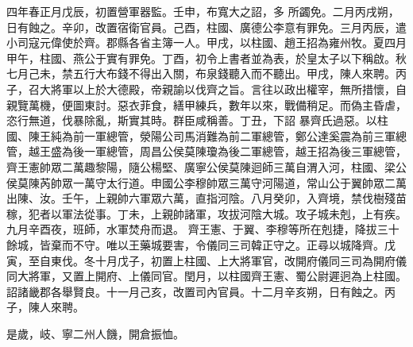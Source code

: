 \begin{pinyinscope}
 四年春正月戊辰，初置營軍器監。壬申，布寬大之詔，多
 所蠲免。二月丙戌朔，日有蝕之。辛卯，改置宿衛官員。己酉，柱國、廣德公李意有罪免。三月丙辰，遣小司寇元偉使於齊。郡縣各省主簿一人。甲戌，以柱國、趙王招為雍州牧。夏四月甲午，柱國、燕公于實有罪免。丁酉，初令上書者並為表，於皇太子以下稱啟。秋七月己未，禁五行大布錢不得出入關，布泉錢聽入而不聽出。甲戌，陳人來聘。丙子，召大將軍以上於大德殿，帝親諭以伐齊之旨。言往以政出權宰，無所措懷，自親覽萬機，便圖東討。惡衣菲食，繕甲練兵，數年以來，戰備稍足。而偽主昏虐，恣行無道，伐暴除亂，斯實其時。群臣咸稱善。丁丑，下詔
 暴齊氏過惡。以柱國、陳王純為前一軍總管，滎陽公司馬消難為前二軍總管，鄭公達奚震為前三軍總管，越王盛為後一軍總管，周昌公侯莫陳瓊為後二軍總管，越王招為後三軍總管，齊王憲帥眾二萬趣黎陽，隨公楊堅、廣寧公侯莫陳迴師三萬自渭入河，柱國、梁公侯莫陳芮帥眾一萬守太行道。申國公李穆帥眾三萬守河陽道，常山公于翼帥眾二萬出陳、汝。壬午，上親帥六軍眾六萬，直指河陰。八月癸卯，入齊境，禁伐樹殘苗稼，犯者以軍法從事。丁未，上親帥諸軍，攻拔河陰大城。攻子城未剋，上有疾。九月辛酉夜，班師，水軍焚舟而退。
 齊王憲、于翼、李穆等所在剋捷，降拔三十餘城，皆棄而不守。唯以王藥城要害，令儀同三司韓正守之。正尋以城降齊。戊寅，至自東伐。冬十月戊子，初置上柱國、上大將軍官，改開府儀同三司為開府儀同大將軍，又置上開府、上儀同官。閏月，以柱國齊王憲、蜀公尉遲迥為上柱國。詔諸畿郡各舉賢良。十一月己亥，改置司內官員。十二月辛亥朔，日有蝕之。丙子，陳人來聘。



 是歲，岐、寧二州人饑，開倉振恤。




\end{pinyinscope}
